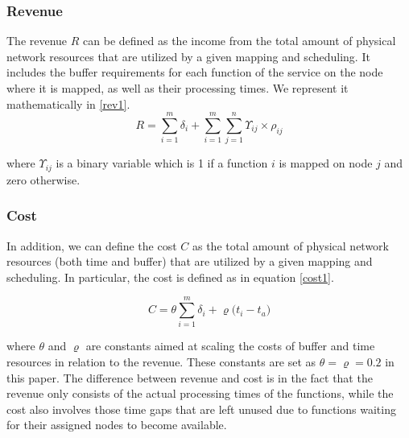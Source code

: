 \documentclass[conference]{IEEEtran}
\begin{document}
\subsubsection{Revenue}
The revenue $R$ can be defined as the income from the total amount of physical network resources that are utilized by a given mapping and scheduling. It includes the buffer requirements for each function of the service on the node where it is mapped, as well as their processing times. We represent it mathematically in \eqref{rev1}.
\begin{equation}
R = \sum\limits_{i=1}^{m} \delta_{i} + \sum\limits_{i=1}^{m} \sum\limits_{j=1}^{n} \Upsilon_{ij} \times \rho_{ij} 
\label{rev1}
\end{equation}

where $\Upsilon_{ij}$ is a binary variable which is 1 if a function $i$ is mapped on node $j$ and zero otherwise.  
\subsubsection{Cost}
In addition, we can define the cost $C$ as the total amount of physical network resources (both time and buffer) that are utilized by a given mapping and scheduling. In particular, the cost is defined as in equation \eqref{cost1}.

\begin{equation}
C = \theta \sum\limits_{i=1}^{m} \delta_{i} + \varrho \Big(t_i - t_a \Big)
\label{cost1}
\end{equation}

where $\theta$ and $\varrho$ are constants aimed at scaling the costs of buffer and time resources in relation to the revenue. These constants are set as $\theta = \varrho = 0.2$ in this paper. The difference between revenue and cost is in the fact that the revenue only consists of the actual processing times of the functions, while the cost also involves those time gaps that are left unused due to functions waiting for their assigned nodes to become available.
\end{document}
